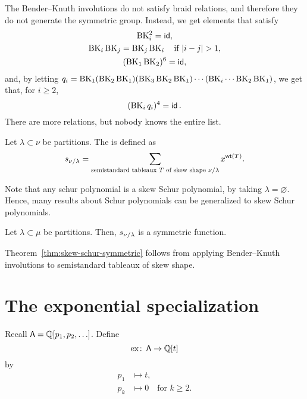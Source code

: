 \begin{remark}
    The Bender--Knuth involutions do not satisfy braid relations,
    and therefore they do not generate the symmetric group.
    Instead, we get elements that satisfy
    \begin{gather}
        \operatorname{BK}_{i}^2 = \operatorname{\mathsf{id}}, \\
        \operatorname{BK}_{i} \operatorname{BK}_{j} = \operatorname{BK}_{j} \operatorname{BK}_{i} \quad \text{if } |i - j| > 1, \\
        (\operatorname{BK}_{1} \operatorname{BK}_{2})^6 = \operatorname{\mathsf{id}},
    \end{gather}
    and, by letting \(q_i =
    \operatorname{BK}_{1}
    (\operatorname{BK}_{2} \operatorname{BK}_{1})
    (\operatorname{BK}_{3} \operatorname{BK}_{2} \operatorname{BK}_{1})
    \cdots
    (\operatorname{BK}_{i} \cdots \operatorname{BK}_{2} \operatorname{BK}_{1})\),
    we get that, for \(i \geq 2\),
    \begin{equation}
        (\operatorname{BK}_{i} q_i)^4 = \operatorname{\mathsf{id}}.
    \end{equation}
    There are more relations, but nobody knows the entire list.
\end{remark}

\begin{definition} \label{def:skew-schur}
    Let \(\lambda \subset \nu\) be partitions.
    The  is defined as
    \begin{equation}
        s_{\nu / \lambda} = \sum_{\text{semistandard tableaux } T \text{ of skew shape } \nu / \lambda} x^{\operatorname{\mathsf{wt}}(T)}.
    \end{equation}
\end{definition}

Note that any schur polynomial is a skew Schur polynomial, by taking \(\lambda = \varnothing\).
Hence, many results about Schur polynomials can be generalized to skew Schur polynomials.

\begin{theorem} \label{thm:skew-schur-symmetric}
    Let \(\lambda \subset \mu\) be partitions.
    Then, \(s_{\nu / \lambda}\) is a symmetric function.
\end{theorem}

Theorem~\ref{thm:skew-schur-symmetric} follows from applying Bender--Knuth involutions to semistandard tableaux of skew shape.

\section{The exponential specialization}

Recall \(\operatorname{\mathsf{\Lambda}} = \mathbb{Q}[p_1, p_2, \ldots]\).
Define
\begin{equation}
    \operatorname{ex} \colon \operatorname{\mathsf{\Lambda}} \to \mathbb{Q}[t]
\end{equation}
by
\begin{align*}
    p_1 &\mapsto t, \\
    p_k &\mapsto 0 \quad \text{for } k \geq 2.
\end{align*}

